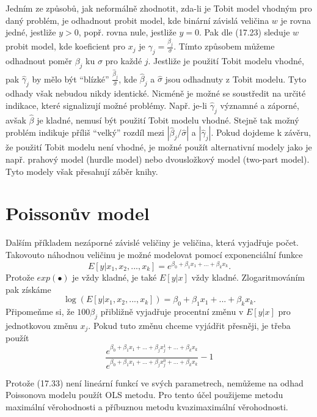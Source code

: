 Jedním ze způsobů, jak neformálně zhodnotit, zda-li je Tobit model vhodným pro daný problém, je odhadnout probit model, kde binární závislá veličina $w$ je rovna jedné, jestliže $y > 0$, popř. rovna nule, jestliže $y = 0$. Pak dle (17.23) sleduje $w$ probit model, kde koeficient pro $x_j$  je $\gamma_j = \frac{\beta_j}{\sigma}$. Tímto způsobem můžeme odhadnout poměr $\beta_j$ ku $\sigma$ pro každé $j$. Jestliže je použití Tobit modelu vhodné, pak $\hat{\gamma}_j$ by mělo být ``blízké'' $\frac{\hat{\beta}_j}{\hat{\sigma}}$, kde $\hat{\beta}_j$ a $\hat{\sigma}$ jsou odhadnuty z Tobit modelu. Tyto odhady však nebudou nikdy identické. Nicméně je možné se soustředit na určité indikace, které signalizují možné problémy. Např. je-li $\hat{\gamma}_j$ významné a záporné, avšak $\hat{\beta}$ je kladné, nemusí být použití Tobit modelu vhodné. Stejně tak možný problém indikuje příliš ``velký'' rozdíl mezi $|\hat{\beta}_j / \hat{\sigma}|$ a $|\hat{\gamma}_j|$. Pokud dojdeme k závěru, že použití Tobit modelu není vhodné, je možné použít alternativní modely jako je např. prahový model (hurdle model) nebo dvousložkový model (two-part model). Tyto modely však přesahují záběr knihy.

\section{Poissonův model}

Dalším příkladem nezáporné závislé veličiny je veličina, která vyjadřuje počet. Takovouto náhodnou veličinu je možné modelovat pomocí exponenciální funkce
\begin{equation}
E[y| x_1, x_2, ..., x_k] = e^{\beta_0 + \beta_1 x_1 + ... + \beta_k x_k}.
\end{equation}
Protože $exp(\bullet)$ je vždy kladné, je také $E[y|x]$ vždy kladné. Zlogaritmováním pak získáme
\begin{equation}
\log(E[y|x_1, x_2, ..., x_k]) = \beta_0 + \beta_1 x_1 + ... + \beta_k x_k.
\end{equation}
Připomeňme si, že $100 \beta_j$ přibližně vyjadřuje procentní změnu v $E[y|x]$ pro jednotkovou změnu $x_j$. Pokud tuto změnu chceme vyjádřit přesněji, je třeba použít
\begin{equation}
\frac{e^{\beta_0 + \beta_1 x_1 + ... + \beta_j x_j^1 + ... + \beta_k x_k}}{e^{\beta_0 + \beta_1 x_1 + ... + \beta_j x_j^0 + ... + \beta_k x_k}} - 1
\end{equation}

Protože (17.33) není lineární funkcí ve svých parametrech, nemůžeme na odhad Poissonova modelu použít OLS metodu. Pro tento účel použijeme metodu maximální věrohodnosti a příbuznou metodu kvazimaximální věrohodnosti.

